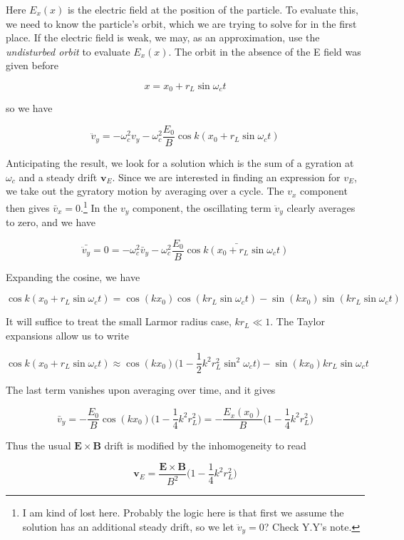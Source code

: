 \documentclass[
  notoc %
]{tufte-book}
\begin{document}
Here \(E_x(x)\) is the electric field at the position of the particle.
To evaluate this, we need to know the particle's orbit, which we are
trying to solve for in the first place. If the electric field is weak,
we may, as an approximation, use the \emph{undisturbed orbit} to
evaluate \(E_x(x)\). The orbit in the absence of the E field was given
before

\[
x = x_0 + r_L\sin \omega_c t
\]

so we have

\[
\ddot{v}_y = -\omega_c^2 v_y -\omega_c^2\frac{E_0}{B}\cos k (x_0 + r_L \sin\omega_c t)
\]

Anticipating the result, we look for a solution which is the sum of a
gyration at \(\omega_c\) and a steady drift \(\mathbf{v}_E\). Since we
are interested in finding an expression for \(v_E\), we take out the
gyratory motion by averaging over a cycle. The \(v_x\) component then
gives \(\bar{v}_x = 0\).\footnote{I am kind of lost here. Probably the
  logic here is that first we assume the solution has an additional
  steady drift, so we let \(\ddot{v}_y = 0\)? Check Y.Y's note.} In the
\(v_y\) component, the oscillating term \(\ddot{v}_y\) clearly averages
to zero, and we have

\[
\bar{\ddot{v}_y} = 0 = -\omega_c^2 \bar{v}_y -\omega_c^2\frac{E_0}{B}\bar{\cos k (x_0 + r_L \sin\omega_c t)}
\]

Expanding the cosine, we have

\[
\cos k (x_0 + r_L \sin\omega_c t) = \cos(kx_0) \cos(kr_L \sin\omega_c t) - \sin(kx_0) \sin(kr_L \sin\omega_c t)
\]

It will suffice to treat the small Larmor radius case, \(kr_L \ll 1\).
The Taylor expansions allow us to write

\[
\cos k (x_0 + r_L \sin\omega_c t) \approx \cos(kx_0)\big( 1 - \frac{1}{2}k^2r_L^2 \sin^2\omega_c t \big) - \sin(kx_0)k r_L \sin\omega_c t
\]

The last term vanishes upon averaging over time, and it gives

\[
\bar{v}_y = -\frac{E_0}{B}\cos(kx_0)\big( 1 - \frac{1}{4}k^2r_L^2 \big) = -\frac{E_x(x_0)}{B}\big( 1 - \frac{1}{4}k^2r_L^2 \big)
\]

Thus the usual \(\mathbf{E}\times\mathbf{B}\) drift is modified by the
inhomogeneity to read

\[
\mathbf{v}_E = \frac{\mathbf{E}\times\mathbf{B}}{B^2}\big( 1 - \frac{1}{4}k^2r_L^2 \big)
\]
\end{document}
